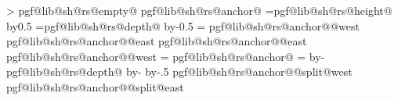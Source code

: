 {{{{            %
            \pgfextract@process{}%
            \addtosavedmacro\centerpoint%
            \pgfmathloop%
                \ifnum\pgfmathcounter>\parts%
                \else%
                    \pgf@lib@sh@getalpha\pgf@lib@sh@rs@number{\pgfmathcounter}%
                    \expandafter\ifx\csname pgf@lib@sh@rs@empty@\pgf@lib@sh@rs@number\endcsname\pgfutil@empty%
                    \else%
                        \csname pgf@lib@sh@rs@anchor@\pgf@lib@sh@rs@number\endcsname%
                        \pgf@ya=\csname pgf@lib@sh@rs@height@\pgf@lib@sh@rs@number\endcsname\relax%
                        \advance\pgf@y by0.5\pgf@ya%
                        \pgf@ya=\csname pgf@lib@sh@rs@depth@\pgf@lib@sh@rs@number\endcsname\relax%
                        \advance\pgf@y by-0.5\pgf@ya%
                        \pgf@ya=\pgf@y%
                        \expandafter\pgfextract@process\csname pgf@lib@sh@rs@anchor@\pgf@lib@sh@rs@number @west\endcsname{%
                            \southwest%
                            \pgf@y=\pgf@ya%
                        }%
                        \expandafter\pgfextract@process\csname pgf@lib@sh@rs@anchor@\pgf@lib@sh@rs@number @east\endcsname{%
                            \northeast%
                            \pgf@y=\pgf@ya%
                        }%
                        \expandafter\addtosavedmacro\csname pgf@lib@sh@rs@anchor@\pgf@lib@sh@rs@number @east\endcsname%
                        \expandafter\addtosavedmacro\csname pgf@lib@sh@rs@anchor@\pgf@lib@sh@rs@number @west\endcsname%
                        \ifnum\pgfmathcounter=\parts%
                        \else%
                            \csname pgf@lib@sh@rs@anchor@\pgf@lib@sh@rs@number\endcsname%
                            \pgf@ya=\pgf@y%
                            \advance\pgf@ya by-\csname pgf@lib@sh@rs@depth@\pgf@lib@sh@rs@number\endcsname\relax%
                            \advance\pgf@ya by-\innerysep\relax%
                            \advance\pgf@ya by-.5\pgflinewidth%
                            \expandafter\pgfextract@process\csname pgf@lib@sh@rs@anchor@\pgf@lib@sh@rs@number @split@west\endcsname{%
                                \southwest%
                                \pgf@y=\pgf@ya%
                            }%
                            \expandafter\pgfextract@process\csname pgf@lib@sh@rs@anchor@\pgf@lib@sh@rs@number @split@east\endcsname{%
                                \northeast%
}}}}}
